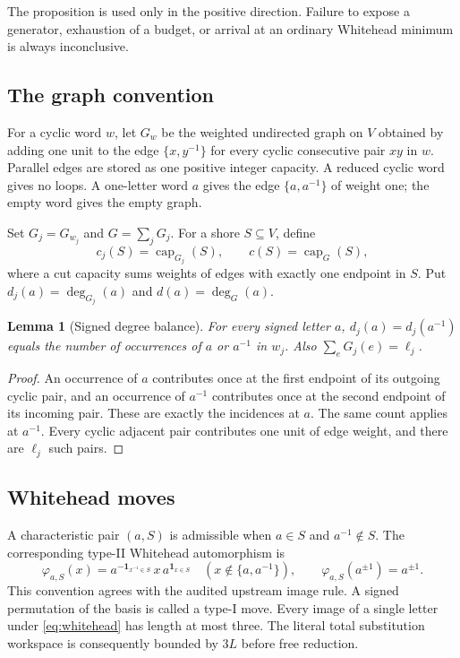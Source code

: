 \documentclass[11pt,letterpaper]{article}
\newtheorem{lemma}[theorem]{Lemma}
\theoremstyle{definition}\newtheorem{definition}[theorem]{Definition}
\newcommand{\capc}{\operatorname{cap}}
\newcommand{\set}[1]{\{#1\}}
\newcommand{\wh}{\varphi_{a,S}}
\begin{document}
The proposition is used only in the positive direction. Failure to expose a generator, exhaustion of a budget, or arrival at an ordinary Whitehead minimum is always inconclusive.

\subsection{The graph convention}
For a cyclic word $w$, let $G_w$ be the weighted undirected graph on $V$ obtained by adding one unit to the edge $\set{x,y^{-1}}$ for every cyclic consecutive pair $xy$ in $w$. Parallel edges are stored as one positive integer capacity. A reduced cyclic word gives no loops. A one-letter word $a$ gives the edge $\set{a,a^{-1}}$ of weight one; the empty word gives the empty graph.

Set $G_j=G_{w_j}$ and $G=\sum_jG_j$. For a shore $S\subseteq V$, define
\[
 c_j(S)=\capc_{G_j}(S),\qquad c(S)=\capc_G(S),
\]
where a cut capacity sums weights of edges with exactly one endpoint in $S$. Put $d_j(a)=\deg_{G_j}(a)$ and $d(a)=\deg_G(a)$.
\begin{lemma}[Signed degree balance]\label{lem:degree}
For every signed letter $a$, $d_j(a)=d_j(a^{-1})$ equals the number of occurrences of $a$ or $a^{-1}$ in $w_j$. Also $\sum_eG_j(e)=\ell_j$.
\end{lemma}
\begin{proof}
An occurrence of $a$ contributes once at the first endpoint of its outgoing cyclic pair, and an occurrence of $a^{-1}$ contributes once at the second endpoint of its incoming pair. These are exactly the incidences at $a$. The same count applies at $a^{-1}$. Every cyclic adjacent pair contributes one unit of edge weight, and there are $\ell_j$ such pairs.
\end{proof}

\subsection{Whitehead moves}
A characteristic pair $(a,S)$ is admissible when $a\in S$ and $a^{-1}\notin S$. The corresponding type-II Whitehead automorphism is
\begin{equation}\label{eq:whitehead}
 \wh(x)=a^{-\mathbf1_{x^{-1}\in S}}\,x\,a^{\mathbf1_{x\in S}}
 \quad (x\notin\set{a,a^{-1}}),\qquad \wh(a^{\pm1})=a^{\pm1}.
\end{equation}
This convention agrees with the audited upstream image rule. A signed permutation of the basis is called a type-I move. Every image of a single letter under \eqref{eq:whitehead} has length at most three. The literal total substitution workspace is consequently bounded by $3L$ before free reduction.
\end{document}
